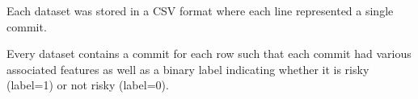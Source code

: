  Each dataset was stored in a CSV format where each line represented a single commit.
 
  Every dataset contains a commit for each row such that each commit had various associated features as well as a binary label indicating whether it is risky (label=1) or not risky (label=0). 
  
  
  
  
  
  